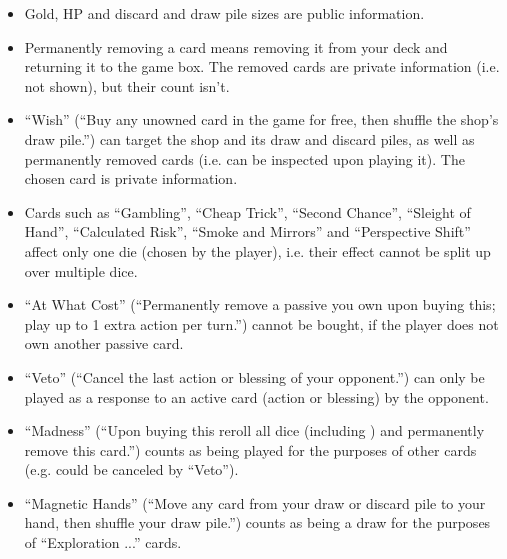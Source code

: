 \documentclass[dvipsnames,parskip,a4paper]{scrartcl}
\newcommand{\iconsize}{3.4mm}
\newcommand{\icondepth}{0.45mm}
\newcommand{\icon}[1]{\raisebox{-\icondepth}{\texttt{[image:  \#1 ]}}}
\newcommand{\chance}{\icon{icons/chance.png}}
\begin{document}
\begin{itemize}
\item Gold, HP and discard and draw pile sizes are public information.
\item Permanently removing a card means removing it from your deck and returning it to the game box. The removed cards are private information (i.e. not shown), but their count isn't.
\item ``Wish'' (``Buy any unowned card in the game for free, then shuffle the shop's draw pile.'') can target the shop and its draw and discard piles, as well as permanently removed cards (i.e. can be inspected upon playing it). The chosen card is private information.
\item Cards such as ``Gambling'', ``Cheap Trick'', ``Second Chance'', ``Sleight of Hand'', ``Calculated Risk'', ``Smoke and Mirrors'' and ``Perspective Shift'' affect only one die (chosen by the player), i.e. their effect cannot be split up over multiple dice.
\item ``At What Cost'' (``Permanently remove a passive you own upon buying this; play up to 1 extra action per turn.'') cannot be bought, if the player does not own another passive card.
\item ``Veto'' (``Cancel the last action or blessing of your opponent.'') can only be played as a response to an active card (action or blessing) by the opponent.
\item ``Madness'' (``Upon buying this reroll all dice (including \chance) and permanently remove this card.'') counts as being played for the purposes of other cards (e.g. could be canceled by ``Veto''). 
\item ``Magnetic Hands'' (``Move any card from your draw or discard pile to your hand, then shuffle your draw pile.'') counts as being a draw for the purposes of ``Exploration ...'' cards.
\end{itemize}

\newpage
\end{document}
